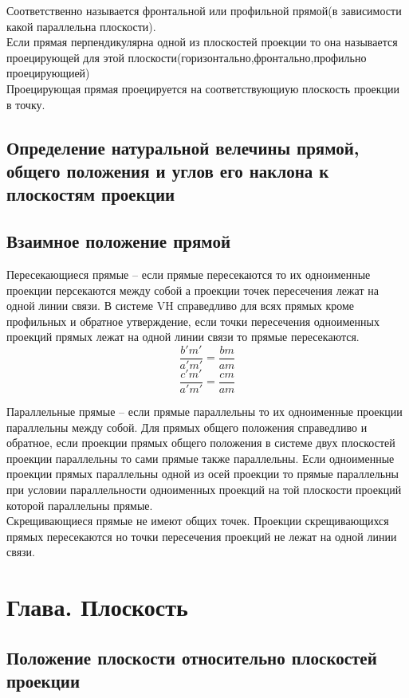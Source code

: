 \documentclass[a4paper, 12pt]{article}
\begin{document}
Соответственно называется фронтальной или профильной прямой(в зависимости какой параллельна плоскости).\\
Если прямая перпендикулярна одной из плоскостей проекции то она называется проецирующей для этой плоскости(горизонтально,фронтально,профильно проецирующией)\\
Проецирующая прямая проецируется на соответствующиую плоскость проекции в точку.\\

\subsection{Определение натуральной велечины прямой, общего положения и углов его наклона к плоскостям проекции}

\subsection{Взаимное положение прямой}

Пересекающиеся прямые -- если прямые пересекаются то их одноименные проекции персекаются между собой а проекции точек пересечения лежат на одной линии связи. В системе VH справедливо для всях прямых кроме профильных и обратное утверждение, если точки пересечения одноименных проекций прямых лежат на одной линии связи то прямые пересекаются.\\
\[
	\frac{b' m'}{a' m'} = \frac{b m}{a m}	
\]
\[
	\frac{c' m'}{a' m'} = \frac{cm}{am}	
\]

Параллельные прямые -- если прямые параллельны то их одноименные проекции параллельны между собой. Для прямых общего положения справедливо и обратное, если проекции прямых общего положения в системе двух плоскостей проекции параллельны то сами прямые также параллельны. Если одноименные проекции прямых параллельны одной из осей проекции то прямые параллельны при условии параллельности одноименных проекций на той плоскости проекций которой параллельны прямые.\\

Скрещивающиеся прямые не имеют общих точек. Проекции скрещивающихся прямых пересекаются но точки пересечения проекций не лежат на одной линии связи.\\

\section{Глава. Плоскость}
\subsection{Положение плоскости относительно плоскостей проекции}
\end{document}
